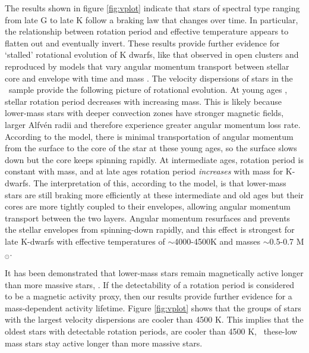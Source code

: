 The results shown in figure \ref{fig:vplot} indicate that stars of spectral
type ranging from late G to late K follow a braking law that changes over
time.
In particular, the relationship between rotation period and effective
temperature appears to flatten out and eventually invert.
These results provide further evidence for `stalled' rotational evolution of K
dwarfs, like that observed in open clusters \citep{curtis2019} and reproduced
by models that vary angular momentum transport between stellar core and
envelope with time and mass \citep{spada2019}.
The velocity dispersions of stars in the \mct\ sample provide the following
picture of rotational evolution.
At young ages \citep[younger than around 1 Gyr but still old enough to be on
the main sequence and have transitioned from the `I' sequence to the `C'
sequence ][]{barnes2003}, stellar rotation period decreases with increasing
mass.
This is likely because lower-mass stars with deeper convection zones have
stronger magnetic fields, larger Alfv\'en radii and therefore experience
greater angular momentum loss rate.
According to the \citet{spada2019} model, there is minimal transportation of
angular momentum from the surface to the core of the star at these young ages,
so the surface slows down but the core keeps spinning rapidly.
At intermediate ages, rotation period is constant with mass, and at late ages
rotation period {\it increases} with mass for K-dwarfs.
The interpretation of this, according to the \citet{spada2019} model, is that
lower-mass stars are still braking more efficiently at these intermediate and
old ages but their cores are more tightly coupled to their envelopes, allowing
angular momentum transport between the two layers.
Angular momentum resurfaces and prevents the stellar envelopes from
spinning-down rapidly, and this effect is strongest for late K-dwarfs with
effective temperatures of $\sim$4000-4500K and masses $\sim$0.5-0.7 M$_\odot$.

It has been demonstrated that lower-mass stars remain magnetically active
longer than more massive stars, \citep[\eg][]{west2008, kiman2019}.
If the detectability of a rotation period is considered to be a magnetic
activity proxy, then our results provide further evidence for a mass-dependent
activity lifetime.
Figure \ref{fig:vplot} shows that the groups of stars with the largest
velocity dispersions are cooler than 4500 K.
This implies that the oldest stars with detectable rotation periods, are
cooler than 4500 K, \ie\ these-low mass stars stay active longer than more
massive stars.

